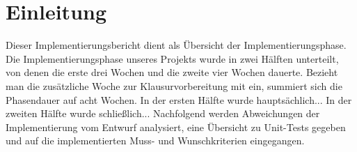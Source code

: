 \chapter{Einleitung}
Dieser Implementierungsbericht dient als Übersicht der Implementierungsphase.\newline
\linebreak
Die Implementierungsphase unseres Projekts wurde in zwei Hälften unterteilt, von denen die erste drei Wochen und die zweite vier Wochen dauerte. Bezieht man die zusätzliche Woche zur Klausurvorbereitung mit ein, summiert sich die Phasendauer auf acht Wochen.\newline
\linebreak
In der ersten Hälfte wurde hauptsächlich...\newline
\linebreak
In der zweiten Hälfte wurde schließlich...\newline
\linebreak
Nachfolgend werden Abweichungen der Implementierung vom Entwurf analysiert, eine Übersicht zu Unit-Tests gegeben und auf die implementierten Muss- und Wunschkriterien eingegangen.